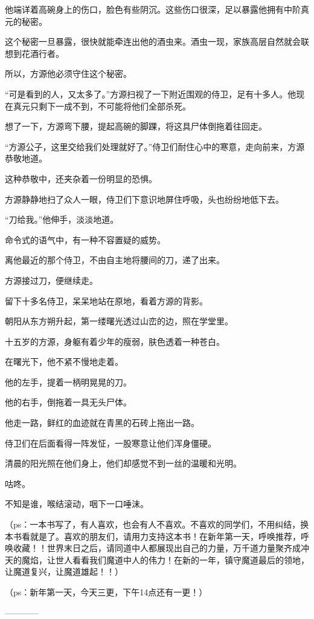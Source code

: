 \begin{this_body}
他端详着高碗身上的伤口，脸色有些阴沉。这些伤口很深，足以暴露他拥有中阶真元的秘密。

这个秘密一旦暴露，很快就能牵连出他的酒虫来。酒虫一现，家族高层自然就会联想到花酒行者。

所以，方源他必须守住这个秘密。

“可是看到的人，又太多了。”方源扫视了一下附近围观的侍卫，足有十多人。他现在真元只剩下一成不到，不可能将他们全部杀死。

想了一下，方源弯下腰，提起高碗的脚踝，将这具尸体倒拖着往回走。

“方源公子，这里交给我们处理就好了。”侍卫们耐住心中的寒意，走向前来，方源恭敬地道。

这种恭敬中，还夹杂着一份明显的恐惧。

方源静静地扫了众人一眼，侍卫们下意识地屏住呼吸，头也纷纷地低下去。

“刀给我。”他伸手，淡淡地道。

命令式的语气中，有一种不容置疑的威势。

离他最近的那个侍卫，不由自主地将腰间的刀，递了出来。

方源接过刀，便继续走。

留下十多名侍卫，呆呆地站在原地，看着方源的背影。

朝阳从东方朔升起，第一缕曙光透过山峦的边，照在学堂里。

十五岁的方源，身躯有着少年的瘦弱，肤色透着一种苍白。

在曙光下，他不紧不慢地走着。

他的左手，提着一柄明晃晃的刀。

他的右手，倒拖着一具无头尸体。

他走一路，鲜红的血迹就在青黑的石砖上拖出一路。

侍卫们在后面看得一阵发怔，一股寒意让他们浑身僵硬。

清晨的阳光照在他们身上，他们却感觉不到一丝的温暖和光明。

咕咚。

不知是谁，喉结滚动，咽下一口唾沫。

（ps：一本书写了，有人喜欢，也会有人不喜欢。不喜欢的同学们，不用纠结，换本书看就是了。喜欢的朋友们，请用力支持这本书！在新年第一天，呼唤推荐，呼唤收藏！！世界末日之后，请同道中人都展现出自己的力量，万千道力量聚齐成冲天的魔焰，让世人看看我们魔道中人的伟力！在新的一年，镇守魔道最后的领地，让魔道复兴，让魔道雄起！！）

（ps：新年第一天，今天三更，下午14点还有一更！）

------------

\end{this_body}

